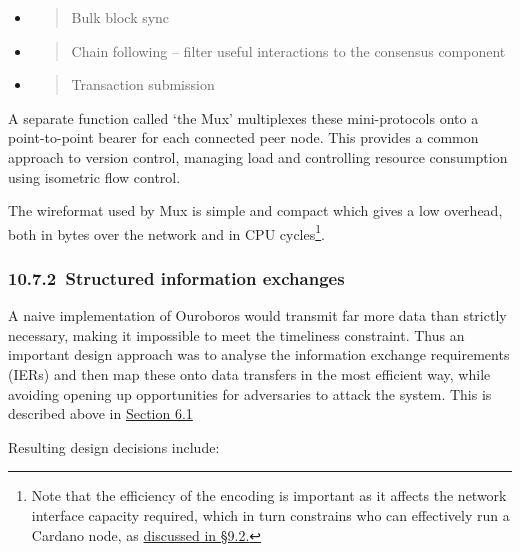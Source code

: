 \documentclass[11pt,a4paper]{article}
\begin{document}
\begin{itemize}
\item
  \begin{quote}
  Bulk block sync
  \end{quote}
\item
  \begin{quote}
  Chain following -- filter useful interactions to the consensus
  component
  \end{quote}
\item
  \begin{quote}
  Transaction submission
  \end{quote}
\end{itemize}

A separate function called `the Mux' multiplexes these mini-protocols
onto a point-to-point bearer for each connected peer node. This provides
a common approach to version control, managing load and controlling
resource consumption using isometric flow control.

The wireformat used by Mux is simple and compact which gives a low
overhead, both in bytes over the network and in CPU cycles\footnote{Note
  that the efficiency of the encoding is important as it affects the
  network interface capacity required, which in turn constrains who can
  effectively run a Cardano node, as
  \protect\hyperlink{fundamental-tradeoffs}{{discussed in §9.2.}}}.

\hypertarget{structured-information-exchanges}{%
\subsubsection{​10.7.2​~Structured information
exchanges}\label{structured-information-exchanges}}

A naive implementation of Ouroboros would transmit far more data than
strictly necessary, making it impossible to meet the timeliness
constraint. Thus an important design approach was to analyse the
information exchange requirements (IERs) and then map these onto data
transfers in the most efficient way, while avoiding opening up
opportunities for adversaries to attack the system. This is described
above in
\protect\hyperlink{consensus-constraints-and-design-decisions}{{Section
6.1}}

Resulting design decisions include:
\end{document}

